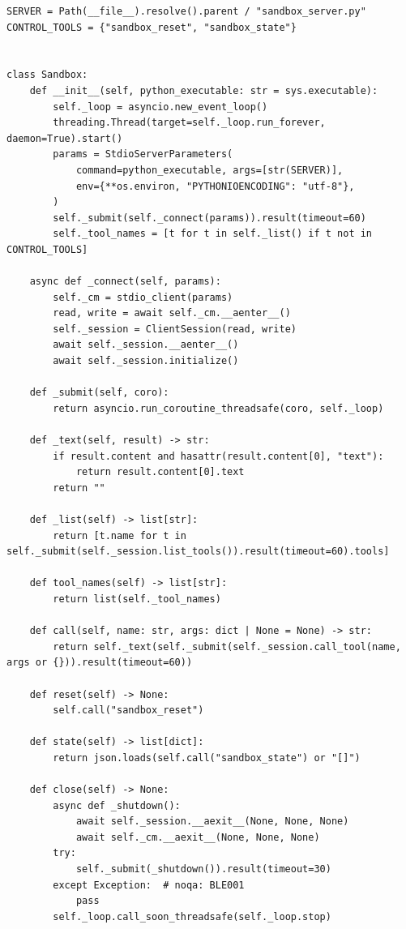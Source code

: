 \documentclass[11pt,a4paper]{article}
\begin{document}
\begin{lstlisting}[firstnumber=23,style=py,caption={Synchronous sandbox client (\texttt{benchmark/sandbox.py}, lines 23--76)},label={lst:sandboxclient}]
SERVER = Path(__file__).resolve().parent / "sandbox_server.py"
CONTROL_TOOLS = {"sandbox_reset", "sandbox_state"}


class Sandbox:
    def __init__(self, python_executable: str = sys.executable):
        self._loop = asyncio.new_event_loop()
        threading.Thread(target=self._loop.run_forever, daemon=True).start()
        params = StdioServerParameters(
            command=python_executable, args=[str(SERVER)],
            env={**os.environ, "PYTHONIOENCODING": "utf-8"},
        )
        self._submit(self._connect(params)).result(timeout=60)
        self._tool_names = [t for t in self._list() if t not in CONTROL_TOOLS]

    async def _connect(self, params):
        self._cm = stdio_client(params)
        read, write = await self._cm.__aenter__()
        self._session = ClientSession(read, write)
        await self._session.__aenter__()
        await self._session.initialize()

    def _submit(self, coro):
        return asyncio.run_coroutine_threadsafe(coro, self._loop)

    def _text(self, result) -> str:
        if result.content and hasattr(result.content[0], "text"):
            return result.content[0].text
        return ""

    def _list(self) -> list[str]:
        return [t.name for t in self._submit(self._session.list_tools()).result(timeout=60).tools]

    def tool_names(self) -> list[str]:
        return list(self._tool_names)

    def call(self, name: str, args: dict | None = None) -> str:
        return self._text(self._submit(self._session.call_tool(name, args or {})).result(timeout=60))

    def reset(self) -> None:
        self.call("sandbox_reset")

    def state(self) -> list[dict]:
        return json.loads(self.call("sandbox_state") or "[]")

    def close(self) -> None:
        async def _shutdown():
            await self._session.__aexit__(None, None, None)
            await self._cm.__aexit__(None, None, None)
        try:
            self._submit(_shutdown()).result(timeout=30)
        except Exception:  # noqa: BLE001
            pass
        self._loop.call_soon_threadsafe(self._loop.stop)
\end{lstlisting}
\end{document}
